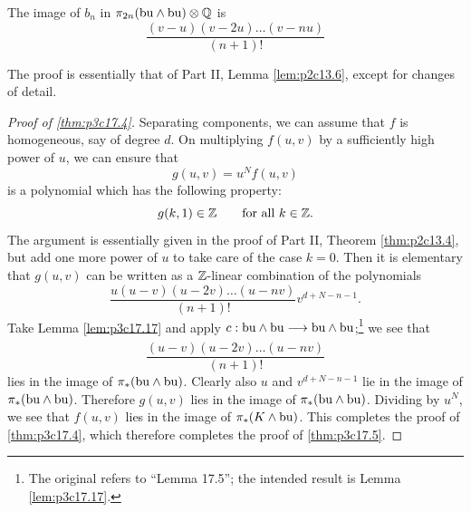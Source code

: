 \documentclass[../main]{subfiles}
\begin{document}
\begin{lemma}
\label{lem:p3c17.17}
The image of $b_n$ in $\pi_{2n}(\mathrm{bu} \wedge \mathrm{bu}) \otimes \mathbb{Q}$ is \[\frac {(v - u)(v - 2u) \ldots (v - nu)} {(n + 1)!}\]
\end{lemma}

The proof is essentially that of Part II, Lemma \ref{lem:p2c13.6}, except for changes of detail.

\begin{proof}[Proof of \ref{thm:p3c17.4}]
Separating components, we can assume that $f$ is homogeneous, say of degree $d$. On multiplying $f(u,v)$ by a sufficiently high power of $u$, we can ensure that \[g(u,v)=u^Nf(u,v)\] is a polynomial which has the following property: \[g(k,1)\in\mathbb{Z}\qquad\text{for all }k\in\mathbb{Z}.\] The argument is essentially given in the proof of Part II, Theorem \ref{thm:p2c13.4}, but add one more power of $u$ to take care of the case $k=0$. Then it is elementary that $g(u,v)$ can be written as a $\mathbb{Z}$-linear combination of the polynomials \[\frac{u(u-v)(u-2v)\ldots(u-nv)}{(n+1)!}v^{d+N-n-1}.\]
Take Lemma \ref{lem:p3c17.17} and apply $c:\te{bu}\wedge\te{bu}\lar{}\te{bu}\wedge\te{bu}$;\footnote{The original refers to ``Lemma 17.5''; the intended result is Lemma \ref{lem:p3c17.17}.} we see that \[\frac{(u-v)(u-2v)\ldots(u-nv)}{(n+1)!}\] lies in the image of $\pi_\ast(\mathrm{bu}\wedge\mathrm{bu})$. Clearly also $u$ and $v^{d+N-n-1}$ lie in the image of $\pi_\ast(\mathrm{bu}\wedge\mathrm{bu})$. Therefore $g(u,v)$ lies in the image of $\pi_\ast(\mathrm{bu}\wedge\mathrm{bu})$. Dividing by $u^N$, we see that $f(u,v)$ lies in the image of $\pi_\ast(K\wedge\mathrm{bu})$. This completes the proof of \ref{thm:p3c17.4}, which therefore completes the proof of \ref{thm:p3c17.5}.
\end{proof}
\end{document}
